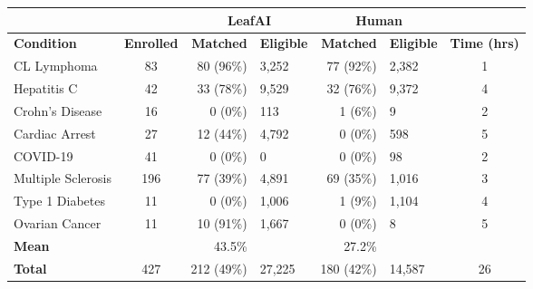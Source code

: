 \def\arraystretch{1.0}
\small
\begin{tabular}{l c |r l |r l |c}
     & & \multicolumn{2}{c}{\textbf{LeafAI}} & \multicolumn{2}{|c}{\textbf{Human}}  \\
     \toprule
    \textbf{Condition} & \textbf{Enrolled} & \textbf{Matched} & \textbf{Eligible} & \textbf{Matched} & \textbf{Eligible} & \textbf{Time (hrs)} \\
    \midrule
    CL Lymphoma       & 83 & 80 (96\%) & 3,252 & 77 (92\%) & 2,382 & 1 \\
    Hepatitis C       & 42 & 33 (78\%) & 9,529 & 32 (76\%) & 9,372 & 4 \\
    Crohn's Disease   & 16 & 0 (0\%) & 113 & 1 (6\%) & 9 & 2 \\
    Cardiac Arrest     & 27 & 12 (44\%) & 4,792 & 0 (0\%) & 598 & 5 \\
    COVID-19           & 41 & 0 (0\%) & 0 & 0 (0\%) & 98 & 2 \\
    Multiple Sclerosis & 196 & 77 (39\%) & 4,891 & 69 (35\%) & 1,016 & 3 \\
    Type 1 Diabetes    & 11  & 0 (0\%) & 1,006 & 1 (9\%) & 1,104 & 4 \\
    Ovarian Cancer     & 11 & 10 (91\%) & 1,667 & 0 (0\%) & 8 & 5 \\
    \bottomrule
    \textbf{Mean} & & 43.5\% & & 27.2\% & \\
    \textbf{Total} & 427 & 212 (49\%) & 27,225 & 180 (42\%) & 14,587 & 26  \\
\end{tabular}